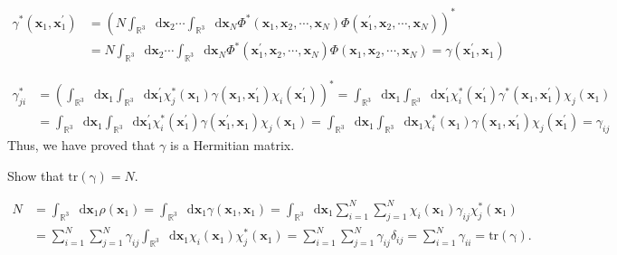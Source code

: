 \documentclass[a4paper]{book}
\newcommand\tr[1]{\mathrm{tr(#1)}}
\newcommand*{\dif}{\mathop{}\!\mathrm{d}}
\begin{document}
	\begin{solution}

	\begin{align*}
		\gamma^*( \boldsymbol{x}_1 , \boldsymbol{x}^\prime_1 ) &= \left( N \int_{\mathbb{R}^3} \dif \boldsymbol{x}_2 \cdots \int_{\mathbb{R}^3} \dif \boldsymbol{x}_N \Phi^*( \boldsymbol{x}_1 , \boldsymbol{x}_2 , \cdots , \boldsymbol{x}_N ) \Phi( \boldsymbol{x}^\prime_1 , \boldsymbol{x}_2 , \cdots , \boldsymbol{x}_N ) \right)^* \\
		&= N \int_{\mathbb{R}^3} \dif \boldsymbol{x}_2 \cdots \int_{\mathbb{R}^3} \dif \boldsymbol{x}_N \Phi^*( \boldsymbol{x}^\prime_1 , \boldsymbol{x}_2 , \cdots , \boldsymbol{x}_N ) \Phi( \boldsymbol{x}_1 , \boldsymbol{x}_2 , \cdots , \boldsymbol{x}_N ) = \gamma( \boldsymbol{x}^\prime_1 , \boldsymbol{x}_1 )
	\end{align*}
	
	\begin{align*}
		\gamma^*_{ji} &= \left( \int_{\mathbb{R}^3} \dif \boldsymbol{x}_1 \int_{\mathbb{R}^3} \dif \boldsymbol{x}^\prime_1 \chi^*_j( \boldsymbol{x}_1 ) \gamma( \boldsymbol{x}_1 , \boldsymbol{x}^\prime_1 ) \chi_i( \boldsymbol{x}^\prime_1 ) \right)^* = \int_{\mathbb{R}^3} \dif \boldsymbol{x}_1 \int_{\mathbb{R}^3} \dif \boldsymbol{x}^\prime_1 \chi^*_i( \boldsymbol{x}^\prime_1 ) \gamma^*( \boldsymbol{x}_1 , \boldsymbol{x}^\prime_1 ) \chi_j( \boldsymbol{x}_1 ) \\
		&= \int_{\mathbb{R}^3} \dif \boldsymbol{x}_1 \int_{\mathbb{R}^3} \dif \boldsymbol{x}^\prime_1 \chi^*_i( \boldsymbol{x}^\prime_1 ) \gamma( \boldsymbol{x}^\prime_1 , \boldsymbol{x}_1 ) \chi_j( \boldsymbol{x}_1 ) = \int_{\mathbb{R}^3} \dif \boldsymbol{x}_1 \int_{\mathbb{R}^3} \dif \boldsymbol{x}_1 \chi^*_i( \boldsymbol{x}_1 ) \gamma( \boldsymbol{x}_1 , \boldsymbol{x}^\prime_1 ) \chi_j( \boldsymbol{x}^\prime_1 ) = \gamma_{ij}
	\end{align*}
	Thus, we have proved that $\gamma$ is a Hermitian matrix.
	
	\end{solution}
	
	\begin{exercise}
	Show that $\tr{\gamma}=N$.
	\end{exercise}
	
	\begin{solution}
	
	\begin{align*}
		N &= \int_{ \mathbb{R}^3 } \dif \boldsymbol{x}_1 \rho( \boldsymbol{x}_1 ) = \int_{ \mathbb{R}^3 } \dif \boldsymbol{x}_1 \gamma( \boldsymbol{x}_1 , \boldsymbol{x}_1  ) = \int_{ \mathbb{R}^3 } \dif \boldsymbol{x}_1 \sum_{ i=1 }^N \sum_{ j=1 }^N \chi_i( \boldsymbol{x}_1 ) \gamma_{ij} \chi^*_j( \boldsymbol{x}_1 ) \\
		&= \sum_{ i=1 }^N \sum_{ j=1 }^N \gamma_{ij} \int_{ \mathbb{R}^3 } \dif \boldsymbol{x}_1 \chi_i( \boldsymbol{x}_1 )  \chi^*_j( \boldsymbol{x}_1 ) = \sum_{ i=1 }^N \sum_{ j=1 }^N \gamma_{ij} \delta_{ij} = \sum_{ i=1 }^N \gamma_{ii} = \tr\gamma.
	\end{align*}
	
	\end{solution}
	
\end{document}
